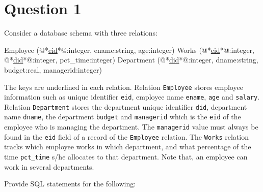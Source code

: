 
\section*{Question 1}

Consider a database schema with three relations:

\begin{terminal}
Employee (@*\underline{eid}*@:integer, ename:string, age:integer)
Works (@*\underline{eid}*@:integer, @*\underline{did}*@:integer, pct\_time:integer)
Department (@*\underline{did}*@:integer, dname:string, budget:real, managerid:integer)
\end{terminal}

The keys are underlined in each relation.
Relation \texttt{Employee} stores employee information such as unique identifier \texttt{eid}, employee name \texttt{ename}, \texttt{age} and \texttt{salary}.
Relation \texttt{Department} stores the department unique identifier \texttt{did}, department name \texttt{dname}, the department \texttt{budget} and \texttt{managerid} which is the \texttt{eid} of the employee who is managing the department.
The \texttt{managerid} value must always be found in the \texttt{eid} field of a record of the \texttt{Employee} relation.
The \texttt{Works} relation tracks which employee works in which department, and what percentage of the time \texttt{pct\_time} s/he allocates to that department.
Note that, an employee can work in several departments.

Provide SQL statements for the following:

